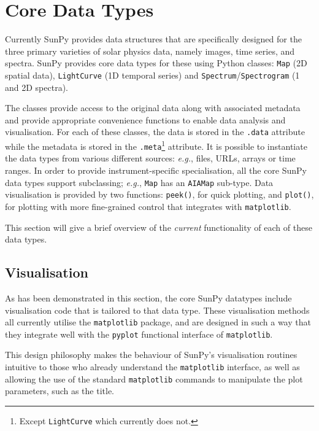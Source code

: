 \section{Core Data Types}\label{sec:DataTypes}

Currently SunPy provides data structures that are specifically designed for the
three primary varieties of solar physics data, namely images, time series, and
spectra. SunPy provides core data types for these using Python classes:
\texttt{Map} (2D spatial data), \texttt{LightCurve} (1D temporal series)
and \texttt{Spectrum}/\texttt{Spectrogram} (1 and 2D spectra). 

The classes provide access to the original data
along with associated metadata and provide appropriate convenience functions to
enable data analysis and visualisation. For each of these classes, the data is
stored in the \texttt{.data} attribute while the metadata is stored 
in the \texttt{.meta}\footnote{Except \texttt{LightCurve} which currently does 
not.} attribute. It is possible to instantiate the data types from various 
different sources: \textit{e.g.}, files, URLs, arrays or time ranges.  In order 
to provide instrument-specific specialisation, all the core SunPy data types 
support subclassing; \textit{e.g.}, \texttt{Map} has an \texttt{AIAMap} 
sub-type. 
Data visualisation is provided by two functions: \texttt{peek()}, for quick 
plotting, and \texttt{plot()}, for plotting with more fine-grained control that 
integrates with \texttt{matplotlib}.


This section will give a brief overview of the \textit{current} functionality 
of each of these data types.





\subsection{Visualisation}
\label{subsec:Viz}
As has been demonstrated in this section, the core SunPy datatypes 
include visualisation code that is tailored to that data type. 
These visualisation methods all currently utilise the \texttt{matplotlib} 
package, and are designed in such a way that they integrate well with 
the \texttt{pyplot} functional interface of \texttt{matplotlib}.

This design philosophy makes the behaviour of SunPy's visualisation 
routines intuitive to those who already understand the \texttt{matplotlib}
interface, as well as allowing the use of the standard 
\texttt{matplotlib} commands to manipulate the plot parameters, such as the 
title.